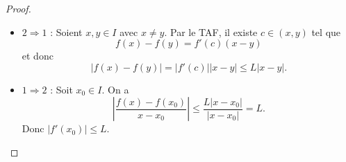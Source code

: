 \begin{proof}
\begin{itemize}
\item $2\Rightarrow 1$ : Soient $x,y\in I$ avec $x\neq y$. Par le TAF, il existe $c\in(x,y)$ tel que 
$$
f(x)-f(y)=f'(c)(x-y)
$$
et donc
$$
|f(x)-f(y)|=|f'(c)||x-y|\le L|x-y|.
$$
\item $1\Rightarrow 2$ : Soit $x_{0}\in I$. On a
$$
\left\lvert  \frac{f(x)-f(x_{0})}{x-x_{0}}  \right\rvert \le \frac{L|x-x_{0}|}{|x-x_{0}|}=L.
$$
Donc $|f'(x_{0})|\le L$.
\end{itemize}
\end{proof}